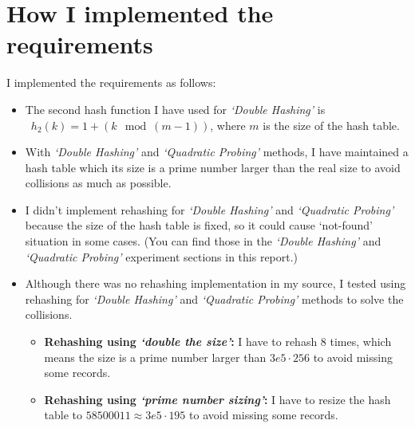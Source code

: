 \section{How I implemented the requirements}
\begin{flushleft}
  I implemented the requirements as follows:
  \begin{itemize}
    \item The second hash function I have used for \textsl{`Double Hashing'} is\\~\(h_2(k) = 1 + (k \mod (m - 1))\), where \(m\) is the size of the hash table.
    \item With \textsl{`Double Hashing'} and \textsl{`Quadratic Probing'} methods, I have maintained a hash table which its size is a prime number larger than the real size to avoid collisions as much as possible.
    \item I didn't implement rehashing for \textsl{`Double Hashing'} and \textsl{`Quadratic Probing'} because the size of the hash table is fixed, so it could cause `not-found' situation in some cases. (You can find those in the \textsl{`Double Hashing'} and \textsl{`Quadratic Probing'} experiment sections in this report.)
    \item Although there was no rehashing implementation in my source, I tested using rehashing for \textsl{`Double Hashing'} and \textsl{`Quadratic Probing'} methods to solve the collisions.
          \begin{itemize}
            \item \textbf{Rehashing using \textit{`double the size'}:} I have to rehash 8 times, which means the size is a prime number larger than \(3e5\cdot256\) to avoid missing some records.
            \item \textbf{Rehashing using \textit{`prime number sizing'}:} I have to resize the hash table to \(58500011\approx 3e5\cdot195\) to avoid missing some records.
          \end{itemize}
  \end{itemize}
\end{flushleft}